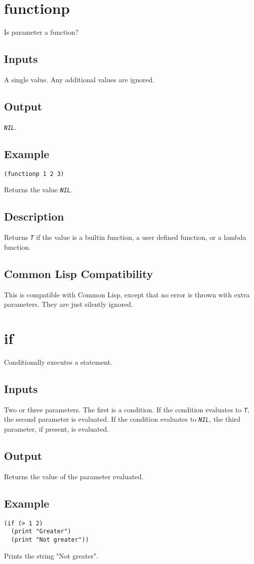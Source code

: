 \documentclass[10pt, openany]{book}
\newcommand{\constant}[1]{\emph{\texttt{#1}}}
\newcommand{\cl}{Common Lisp}
\begin{document}
\section{functionp}
Is parameter a function?
\subsection{Inputs}
A single value.  Any additional values are ignored.
\subsection{Output}
\constant{NIL}.
\subsection{Example}
\begin{lstlisting}
(functionp 1 2 3)
\end{lstlisting}
Returns the value \constant{NIL}.
\subsection{Description}
Returns \constant{T} if the value is a builtin function, a user defined function, or a lambda function.
\subsection{Common Lisp Compatibility}
This is compatible with \cl, except that no error is thrown with extra parameters.  They are just silently ignored.

\section{if}
Conditionally executes a statement.
\subsection{Inputs}
Two or three parameters.  The first is a condition.  If the condition evaluates to \constant{T}, the second parameter is evaluated.  If the condition evaluates to \constant{NIL}, the third parameter, if present, is evaluated.
\subsection{Output}
Returns the value of the parameter evaluated.
\subsection{Example}
\begin{lstlisting}
(if (> 1 2)
  (print "Greater")
  (print "Not greater"))
\end{lstlisting}
Prints the string "Not greater".
\end{document}
